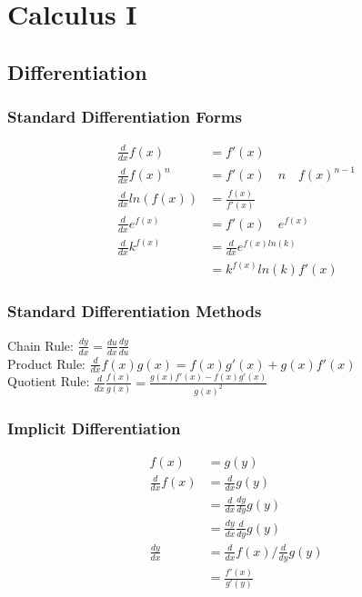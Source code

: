 \documentclass[../main]{subfiles}
\begin{document}
\section{Calculus I}

\subsection{Differentiation}

	\subsubsection{Standard Differentiation Forms}

	\begin{equation*} \begin{aligned}
	\frac{d}{dx} f(x) &= f'(x) \\
	\frac{d}{dx} f(x)^n &= f'(x) \quad n \quad f(x)^{n-1}  \\
	\frac{d}{dx} ln(f(x)) &= \frac{f(x)}{f'(x)} \\
	\frac{d}{dx} e^{f(x)} &= f'(x) \quad e^{f(x)}  \\
	\frac{d}{dx} k^{f(x)} &= \frac{d}{dx} e^{f(x)ln(k)} \\
	&= k^{f(x)}ln(k) f'(x)
	\end{aligned} \end{equation*}

	\subsubsection{Standard Differentiation Methods}

	Chain Rule: \( \frac{dy}{dx} = \frac{du}{dx} \frac{dy}{du} \) \\
	Product Rule: \( \frac{d}{dx} f(x)g(x) = f(x)g'(x) + g(x)f'(x) \) \\
	Quotient Rule: \( \frac{d}{dx} \frac{f(x)}{g(x)} = \frac{g(x)f'(x) - f(x)g'(x)}{g(x)^2} \) 

	\subsubsection{Implicit Differentiation}

	\begin{equation*} \begin{aligned}
		f(x) &= g(y) \\
		\frac{d}{dx} f(x) &= \frac{d}{dx} g(y) \\
		&= \frac{d}{dx} \frac{dy}{dy} g(y) \\
		&= \frac{dy}{dx} \frac{d}{dy} g(y) \\
		\frac{dy}{dx} &= \frac{d}{dx} f(x)/ \frac{d}{dy} g(y) \\
		&= \frac{f'(x)}{g'(y)}
	\end{aligned} \end{equation*}
\end{document}
